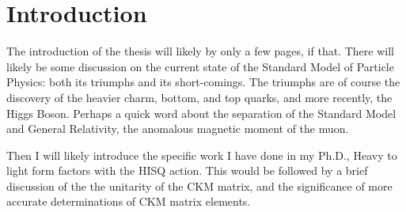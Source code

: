 \chapter{Introduction}\label{cha:introduction}

The introduction of the thesis will likely by only a few pages, if that.  There will likely be some discussion on the current state of the Standard Model of Particle Physics: both its triumphs and its short-comings.  The triumphs are of course the discovery of the heavier charm, bottom, and top quarks, and more recently, the Higgs Boson.  Perhaps a quick word about the separation of the Standard Model and General Relativity, the anomalous magnetic moment of the muon.

Then I will likely introduce the specific work I have done in my Ph.D., Heavy to light form factors with the HISQ action.  This would be followed by a brief discussion of the the unitarity of the CKM matrix, and the significance of more accurate determinations of CKM matrix elements.

